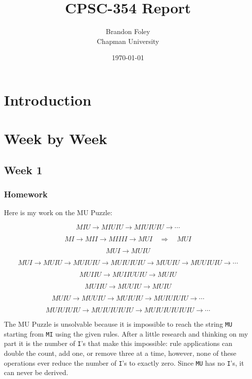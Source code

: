 \documentclass{article}
\title{CPSC-354 Report}
\author{Brandon Foley \\ Chapman University}
\date{\today}
\theoremstyle{theorem}
\theoremstyle{definition}
\theoremstyle{remark}
\begin{document}
\maketitle

\begin{abstract}
\end{abstract}

\setcounter{tocdepth}{3}
\tableofcontents

\section{Introduction}\label{intro}

\section{Week by Week}\label{homework}

\subsection{Week 1}

\subsubsection{Homework}

Here is my work on the MU Puzzle:

\[
MIU \to MIUIU \to MIUIUIU \to \cdots
\]

\[
MI \to MII \to MIIII \to MUI \quad \Rightarrow \quad MUI
\]

\[
MUI \to MUIU
\]

\[
MUI \to MUIU \to MUIUIU \to MUIUIUIU \to MUUIU \to MUUIUIU \to \cdots
\]

\[
MUIIU \to MUIIUUIU \to MUIU
\]

\[
MUIIU \to MUUIU \to MUIU
\]

\[
MUIU \to MUUIU \to MUIUIU \to MUIUIUIU \to \cdots
\]

\[
MUIUIUIU \to MUIUIUIUIU \to MUIUIUIUIUIU \to \cdots
\]


The MU Puzzle is unsolvable because it is impossible to reach the string \texttt{MU} starting from \texttt{MI} using the given rules.  
After a little research and thinking on my part it is the number of \texttt{I}'s that make this impossible: 
rule applications can double the count, add one, or remove three at a time,  
however, none of these operations ever reduce the number of \texttt{I}'s to exactly zero.  
Since \texttt{MU} has no \texttt{I}'s, it can never be derived.  
\end{document}
